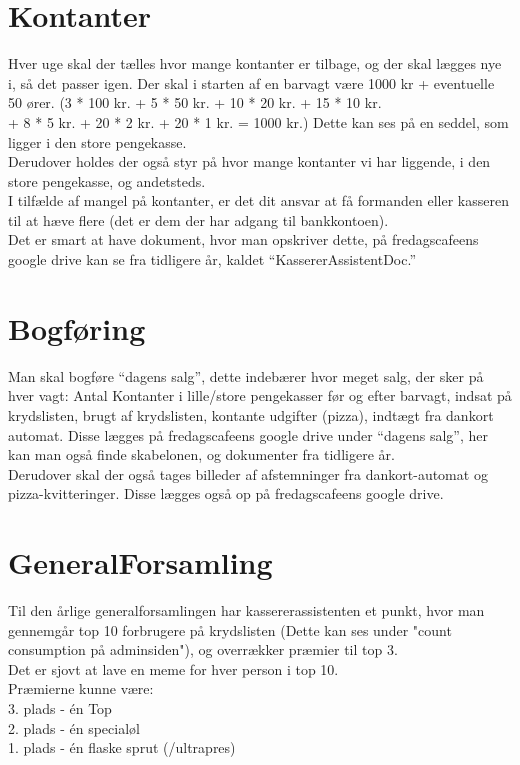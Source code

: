 \section{Kontanter}
Hver uge skal der tælles hvor mange kontanter er tilbage, og der skal lægges
nye i, så det passer igen.
Der skal i starten af en barvagt være 1000 kr + eventuelle 50 ører.
(3 * 100 kr.  + 5 * 50 kr. + 10 * 20 kr. + 15 * 10 kr.
\\+ 8 * 5 kr. + 20 * 2 kr. + 20 * 1 kr. = 1000 kr.)
Dette kan ses på en seddel, som ligger i den store pengekasse.
\\
Derudover holdes der også styr på hvor mange kontanter vi har liggende, i den
store pengekasse, og andetsteds.
\\
I tilfælde af mangel på kontanter, er det dit ansvar at få formanden eller
kasseren til at hæve flere (det er dem der har adgang til bankkontoen).
\\
Det er smart at have dokument, hvor man opskriver dette, på fredagscafeens
google drive kan se fra tidligere år, kaldet ``KassererAssistentDoc.''

\section{Bogføring}
Man skal bogføre ``dagens salg'', dette indebærer hvor meget salg, der sker på
hver vagt:
Antal Kontanter i lille/store pengekasser før og efter barvagt,
indsat på krydslisten, brugt af krydslisten, kontante
udgifter (pizza), indtægt fra dankort automat.
Disse lægges på fredagscafeens google drive under ``dagens salg'', her kan man
også finde skabelonen, og dokumenter fra tidligere år.
\\
Derudover skal der også tages billeder af afstemninger fra dankort-automat og
pizza-kvitteringer. Disse lægges også op på fredagscafeens google drive.

\section{GeneralForsamling}
Til den årlige generalforsamlingen har kassererassistenten et punkt, hvor man gennemgår top 10 forbrugere på krydslisten
(Dette kan ses under "count consumption på adminsiden"), og overrækker præmier til top 3.
\\
Det er sjovt at lave en meme for hver person i top 10.
\\
Præmierne kunne være:
\\
3. plads - én Top
\\
2. plads - én specialøl
\\
1. plads - én flaske sprut (/ultrapres)




